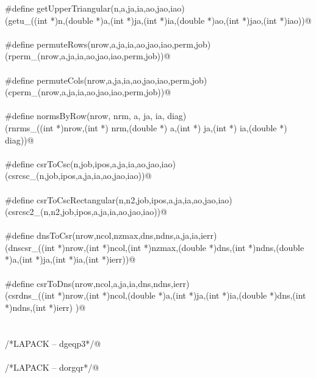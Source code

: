 \documentclass[12pt]{article}
\begin{document}
\begin{flushleft}
\begin{minipage}{\linewidth}
\begin{list}{}{}
\mbox{}\verb@#define getUpperTriangular(n,a,ja,ia,ao,jao,iao)\@\\
\mbox{}\verb@(getu_((int *)n,(double *)a,(int *)ja,(int *)ia,(double *)ao,(int *)jao,(int *)iao))@\\
\mbox{}\verb@@\\
\mbox{}\verb@#define permuteRows(nrow,a,ja,ia,ao,jao,iao,perm,job) \@\\
\mbox{}\verb@(rperm_(nrow,a,ja,ia,ao,jao,iao,perm,job))@\\
\mbox{}\verb@@\\
\mbox{}\verb@#define permuteCols(nrow,a,ja,ia,ao,jao,iao,perm,job) \@\\
\mbox{}\verb@(cperm_(nrow,a,ja,ia,ao,jao,iao,perm,job))@\\
\mbox{}\verb@@\\
\mbox{}\verb@#define normsByRow(nrow, nrm, a, ja, ia, diag) \@\\
\mbox{}\verb@(rnrms_((int *)nrow,(int *) nrm,(double *) a,(int *) ja,(int *) ia,(double *) diag))@\\
\mbox{}\verb@@\\
\mbox{}\verb@#define csrToCsc(n,job,ipos,a,ja,ia,ao,jao,iao) \@\\
\mbox{}\verb@ (csrcsc_(n,job,ipos,a,ja,ia,ao,jao,iao))@\\
\mbox{}\verb@@\\
\mbox{}\verb@#define csrToCscRectangular(n,n2,job,ipos,a,ja,ia,ao,jao,iao)\@\\
\mbox{}\verb@(csrcsc2_(n,n2,job,ipos,a,ja,ia,ao,jao,iao))@\\
\mbox{}\verb@@\\
\mbox{}\verb@#define dnsToCsr(nrow,ncol,nzmax,dns,ndns,a,ja,ia,ierr)\@\\
\mbox{}\verb@(dnscsr_((int *)nrow,(int *)ncol,(int *)nzmax,(double *)dns,(int *)ndns,(double *)a,(int *)ja,(int *)ia,(int *)ierr))@\\
\mbox{}\verb@@\\
\mbox{}\verb@#define csrToDns(nrow,ncol,a,ja,ia,dns,ndns,ierr) \@\\
\mbox{}\verb@(csrdns_((int *)nrow,(int *)ncol,(double *)a,(int *)ja,(int *)ia,(double *)dns,(int *)ndns,(int *)ierr) )@\\
\mbox{}\verb@@\\
\mbox{}\verb@@\\
\mbox{}\verb@/*LAPACK -- dgeqp3*/@\\
\mbox{}\verb@@\\
\mbox{}\verb@/*LAPACK -- dorgqr*/@\\

\end{list}
\end{minipage}
\end{flushleft}
\end{document}
